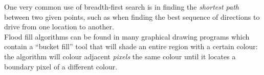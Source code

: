 \begin{solution}
{One very common use of breadth-first search is in finding the 
{\em shortest path}
between two given points, such as when finding the best sequence of directions
to drive from one location to another.  \\

Flood fill algorithms can be found
in many graphical drawing programs which contain a ``bucket fill'' tool
that will shade an entire region with a certain colour:  the algorithm will
colour adjacent {\em pixels} the same colour until it locates a boundary
pixel of a different colour.


}

\end{solution}

